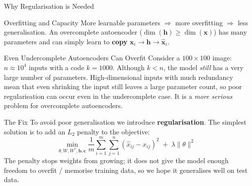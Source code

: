 \documentclass{beamer}
\begin{document}
\begin{frame}[shrink=10]{Why Regularisation is Needed}
  \begin{block}{Overfitting and Capacity}
    More learnable parameters $\Rightarrow$ more overfitting
    $\Rightarrow$ less generalisation. An overcomplete autoencoder
    ($\dim(\mathbf{h}) \geq \dim(\mathbf{x})$) has many parameters and can
    simply learn to \textbf{copy} $\mathbf{x}_i \to \mathbf{h} \to \hat{\mathbf{x}}_i$.
  \end{block}

  \begin{block}{Even Undercomplete Autoencoders Can Overfit}
    Consider a $100\times100$ image: $n \approx 10^4$ inputs with a code
    $k = 1000$. Although $k < n$, the model \emph{still} has a very large
    number of parameters. High-dimensional inputs with much redundancy mean
    that even shrinking the input still leaves a large parameter count, so
    poor regularisation can occur even in the undercomplete case. It is a
    \emph{more serious} problem for overcomplete autoencoders.
  \end{block}

  \begin{exampleblock}{The Fix}
    To avoid poor generalisation we introduce \textbf{regularisation}. The
    simplest solution is to add an $L_2$ penalty to the objective:
    \[
      \min_{\theta,W,W^{*},\mathbf{b},\mathbf{c}}
        \frac{1}{m}\sum_{i=1}^m\sum_{j=1}^n
        (\hat{x}_{ij}-x_{ij})^2
        \;+\; \boxed{\lambda\|\theta\|^2}
    \]
    The penalty stops weights from growing; it does not give the model
    enough freedom to overfit / memorise training data, so we hope it
    generalises well on test data.
  \end{exampleblock}
\end{frame}
\end{document}
